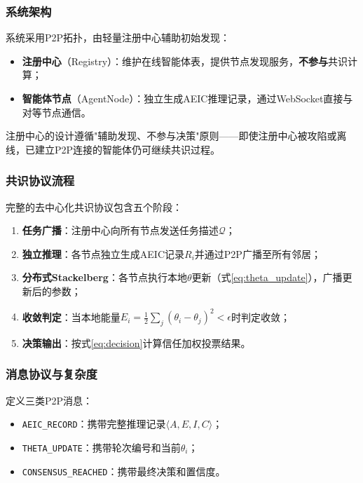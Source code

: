 \documentclass[12pt,a4paper,UTF8,fontset=fandol]{ctexart}
\begin{document}
\subsubsection{系统架构}

系统采用P2P拓扑，由轻量注册中心辅助初始发现：
\begin{itemize}[nosep]
    \item \textbf{注册中心}（Registry）：维护在线智能体表，提供节点发现服务，\textbf{不参与}共识计算；
    \item \textbf{智能体节点}（AgentNode）：独立生成AEIC推理记录，通过WebSocket直接与对等节点通信。
\end{itemize}

注册中心的设计遵循"辅助发现、不参与决策"原则——即使注册中心被攻陷或离线，已建立P2P连接的智能体仍可继续共识过程。

\subsubsection{共识协议流程}

完整的去中心化共识协议包含五个阶段：
\begin{enumerate}[nosep]
    \item \textbf{任务广播}：注册中心向所有节点发送任务描述$\mathcal{Q}$；
    \item \textbf{独立推理}：各节点独立生成AEIC记录$R_i$并通过P2P广播至所有邻居；
    \item \textbf{分布式Stackelberg}：各节点执行本地$\theta$更新（式\eqref{eq:theta_update}），广播更新后的参数；
    \item \textbf{收敛判定}：当本地能量$E_i = \frac{1}{2}\sum_j (\theta_i - \theta_j)^2 < \epsilon$时判定收敛；
    \item \textbf{决策输出}：按式\eqref{eq:decision}计算信任加权投票结果。
\end{enumerate}

\subsubsection{消息协议与复杂度}

定义三类P2P消息：
\begin{itemize}[nosep]
    \item \texttt{AEIC\_RECORD}：携带完整推理记录$\langle A, E, I, C \rangle$；
    \item \texttt{THETA\_UPDATE}：携带轮次编号和当前$\theta_i$；
    \item \texttt{CONSENSUS\_REACHED}：携带最终决策和置信度。
\end{itemize}
\end{document}
